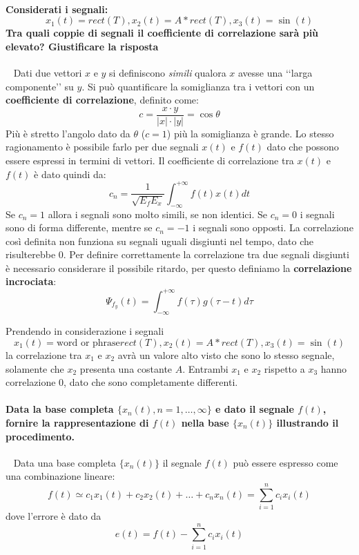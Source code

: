 \documentclass[a4paper,oneside]{scrbook}
\begin{document}
\paragraph{Considerati i segnali:
	$$x_1(t)=rect(T), x_2(t)=A*rect(T), x_3(t)=\sin(t)$$
	Tra quali coppie di segnali il coefficiente di correlazione sarà più elevato? Giustificare la risposta}\
\newline
Dati due vettori $x$ e $y$ si definiscono \textit{simili} qualora $x$ avesse una ‘‘larga componente’’ su $y$. Si può quantificare la somiglianza tra i vettori con
un \textbf{coefficiente di correlazione}, definito come:
\begin{equation*}
	c=\frac{x\cdot y}{|x|\cdot|y|}=\cos\theta
\end{equation*}
Più è stretto l'angolo dato da $\theta$ ($c=1$) più la somiglianza è grande.
Lo stesso ragionamento è possibile farlo per due segnali $x(t)$ e $f(t)$ dato che possono essere espressi in termini di vettori. Il coefficiente di correlazione tra
$x(t)$ e $f(t)$ è dato quindi da:
\begin{equation*}
	c_n=\frac{1}{\sqrt{E_fE_x}}\int_{-\infty}^{+\infty}f(t)x(t)dt
\end{equation*}
Se $c_n=1$ allora i segnali sono molto simili, se non identici. Se $c_n=0$ i segnali sono di forma differente, mentre se $c_n=-1$ i segnali sono opposti.
La correlazione così definita non funziona su segnali uguali disgiunti nel tempo, dato che risulterebbe $0$. Per definire correttamente la correlazione tra due segnali
disgiunti è necessario considerare il possibile ritardo, per questo definiamo la \textbf{correlazione incrociata}:
\begin{equation*}
	\Psi_{f_y}(t)=\int_{-\infty}^{+\infty}f(\tau)g(\tau-t)d\tau
\end{equation*}

Prendendo in considerazione i segnali $$x_1(t)=\text{word or phrase}rect(T), x_2(t)=A*rect(T), x_3(t)=\sin(t)$$ la correlazione tra $x_1$ e $x_2$ avrà un valore alto
visto che sono lo stesso segnale, solamente che $x_2$ presenta una costante $A$.
Entrambi $x_1$ e $x_2$ rispetto a $x_3$ hanno correlazione $0$, dato che sono completamente differenti.

\paragraph{Data la base completa $\{x_n(t), n=1, \ldots, \infty\}$ e dato il segnale $f(t)$, fornire la rappresentazione di $f(t)$ nella base $\{x_n(t)\}$ illustrando il procedimento.}\
\newline
Data una base completa $\{x_n(t)\}$ il segnale $f(t)$ può essere espresso come una combinazione lineare:
\begin{equation*}
	f(t) \simeq c_1x_1(t)+c_2x_2(t)+\ldots+c_nx_n(t)=\sum_{i=1}^{n}c_ix_i(t)
\end{equation*}
dove l'errore è dato da
\begin{equation*}
	e(t)=f(t)-\sum_{i=1}^{n}c_ix_i(t)
\end{equation*}
\end{document}
